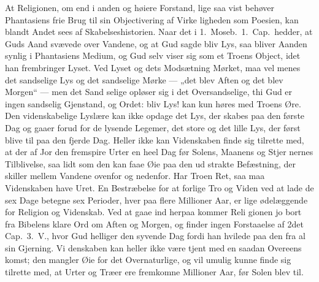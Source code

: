 \documentclass[12pt,a4paper]{article}
\begin{document}
At Religionen, om end i anden og høiere Forstand, lige saa
vist behøver Phantasiens frie Brug til sin Objectivering af Virke\-%
ligheden som Poesien, kan blandt Andet sees af Skabelseshistorien.
Naar det i 1.\ Moseb.\ 1.\ Cap.\ hedder, at Guds Aand svævede over
Vandene, og at Gud sagde bliv Lys, saa bliver Aanden synlig i
Phantasiens Medium, og Gud selv viser sig som et Troens Object,
idet han frembringer Lyset. Ved Lyset og dets Modsætning
Mørket, maa vel menes det sandselige Lys og det sandselige
Mørke --- „det blev Aften og det blev Morgen“ --- men det Sand\-%
selige opløser sig i det Oversandselige, thi Gud er ingen sandselig
Gjenstand, og Ordet: bliv Lys! kan kun høres med Troens Øre.
Den videnskabelige Lyslære kan ikke opdage det Lys, der skabes
paa den første Dag og gaaer forud for de lysende Legemer, det
store og det lille Lys, der først blive til paa den fjerde Dag.
Heller ikke kan Videnskaben finde sig tilrette med, at der af Jor\-%
den fremspire Urter en heel Dag før Solens, Maanens og Stjer\-%
nernes Tilblivelse, saa lidt som den kan faae Øie paa den ud\-%
strakte Befæstning, der skiller mellem Vandene ovenfor og nedenfor.
Har Troen Ret, saa maa Videnskaben have Uret. En Bestræbelse
for at forlige Tro og Viden ved at lade de sex Dage betegne sex
Perioder, hver paa flere Millioner Aar, er lige ødelæggende for
Religion og Videnskab. Ved at gaae ind herpaa kommer Reli\-%
gionen jo bort fra Bibelens klare Ord om Aften og Morgen, og
finder ingen Forstaaelse af 2det Cap.\ 3.\ V., hvor Gud helliger den
syvende Dag fordi han hvilede paa den fra al sin Gjerning. Vi\-%
denskaben kan heller ikke være tjent med en saadan Overeens\-%
komst; den mangler Øie for det Overnaturlige, og vil umulig
kunne finde sig tilrette med, at Urter og Træer ere fremkomne
Millioner Aar, før Solen blev til.
\end{document}
